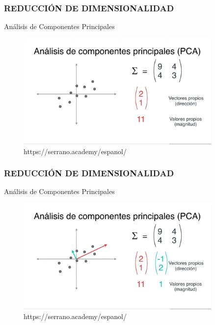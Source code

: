 \documentclass{beamer}
\begin{document}
\begin{frame}
	\frametitle{REDUCCIÓN DE DIMENSIONALIDAD}
	\begin{block}{Análisis de Componentes Principales}	
		\begin{figure}
			\includegraphics[width=0.9\textwidth]{PCA/IMG_3582.jpg}
			\caption{https://serrano.academy/espanol/}
		\end{figure}
	\end{block}
\end{frame}

\begin{frame}
	\frametitle{REDUCCIÓN DE DIMENSIONALIDAD}
	\begin{block}{Análisis de Componentes Principales}	
		\begin{figure}
			\includegraphics[width=0.9\textwidth]{PCA/IMG_3583.jpg}
			\caption{https://serrano.academy/espanol/}
		\end{figure}
	\end{block}
\end{frame}
\end{document}

